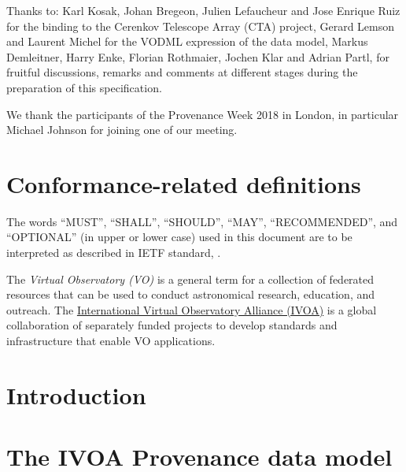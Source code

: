 \documentclass[11pt,a4paper]{ivoa}
\begin{document}
Thanks to: Karl Kosak, Johan Bregeon, Julien Lefaucheur and Jose Enrique Ruiz 
for the binding to the Cerenkov Telescope Array (CTA) project, Gerard
Lemson and Laurent Michel for the VODML expression of the data model, Markus Demleitner,
Harry Enke, Florian Rothmaier, Jochen Klar and Adrian Partl,
for fruitful discussions, remarks and comments at different stages during the preparation of this specification.

We thank the participants of the Provenance Week 2018 in London, in particular Michael Johnson for joining one of our meeting.

\section*{Conformance-related definitions}

The words ``MUST'', ``SHALL'', ``SHOULD'', ``MAY'', ``RECOMMENDED'', and
``OPTIONAL'' (in upper or lower case) used in this document are to be
interpreted as described in IETF standard, \citet{std:RFC2119}.

The \emph{Virtual Observatory (VO)} is
a general term for a collection of federated resources that can be used
to conduct astronomical research, education, and outreach.
The \href{http://www.ivoa.net}{International
Virtual Observatory Alliance (IVOA)} is a global
collaboration of separately funded projects to develop standards and
infrastructure that enable VO applications.

\section{Introduction}
\label{sec:intro}





\section{The IVOA Provenance data model}
\label{sec:datamodel}


%
%
\end{document}
